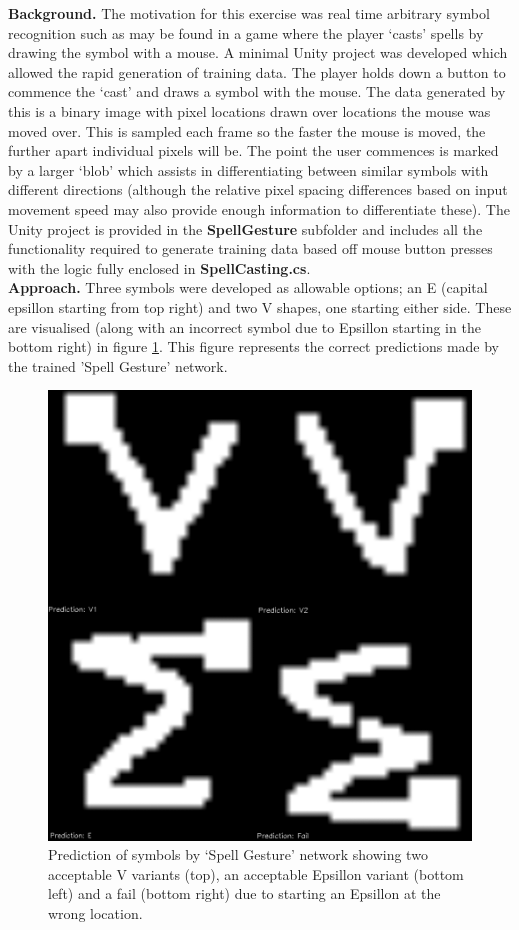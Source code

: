 \documentclass{article}
\begin{document}
\textbf{Background.} The motivation for this exercise was real time arbitrary symbol recognition such as may be found in a game where the player `casts' spells by drawing the symbol with a mouse. A minimal Unity project was developed which allowed the rapid generation of training data. The player holds down a button to commence the `cast' and draws a symbol with the mouse. The data generated by this is a binary image with pixel locations drawn over locations the mouse was moved over. This is sampled each frame so the faster the mouse is moved, the further apart individual pixels will be. The point the user commences is marked by a larger `blob' which assists in differentiating between similar symbols with different directions (although the relative pixel spacing differences based on input movement speed may also provide enough information to differentiate these). The Unity project is provided in the \textbf{SpellGesture} subfolder and includes all the functionality required to generate training data based off mouse button presses with the logic fully enclosed in \textbf{SpellCasting.cs}. \\

\textbf{Approach.} Three symbols were developed as allowable options; an E (capital epsillon starting from top right) and two V shapes, one starting either side. These are visualised (along with an incorrect symbol due to Epsillon starting in the bottom right) in figure \ref{symbolPrediction}. This figure represents the correct predictions made by the trained 'Spell Gesture' network.

\begin{figure}[h!]
	\centering
	\includegraphics[width=0.5\linewidth]{symbolPrediction.png}
	\caption{Prediction of symbols by `Spell Gesture' network showing two acceptable V variants (top), an acceptable Epsillon variant (bottom left) and a fail (bottom right) due to starting an Epsillon at the wrong location.}
	\label{symbolPrediction}
\end{figure}
\end{document}
